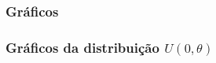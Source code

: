 \subsubsection{Gr\' aficos}
\begin{frame}
\frametitle{Gráficos da distribuiç\~ao $U(0, \theta)$}

\end{frame}
